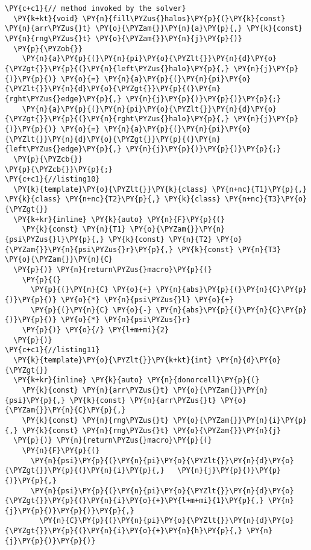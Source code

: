 \begin{Verbatim}[commandchars=\\\{\}]
  \PY{c+c1}{// method invoked by the solver}
  \PY{k+kt}{void} \PY{n}{fill\PYZus{}halos}\PY{p}{(}\PY{k}{const} \PY{n}{arr\PYZus{}t} \PY{o}{\PYZam{}}\PY{n}{a}\PY{p}{,} \PY{k}{const} \PY{n}{rng\PYZus{}t} \PY{o}{\PYZam{}}\PY{n}{j}\PY{p}{)}
  \PY{p}{\PYZob{}}
    \PY{n}{a}\PY{p}{(}\PY{n}{pi}\PY{o}{\PYZlt{}}\PY{n}{d}\PY{o}{\PYZgt{}}\PY{p}{(}\PY{n}{left\PYZus{}halo}\PY{p}{,} \PY{n}{j}\PY{p}{)}\PY{p}{)} \PY{o}{=} \PY{n}{a}\PY{p}{(}\PY{n}{pi}\PY{o}{\PYZlt{}}\PY{n}{d}\PY{o}{\PYZgt{}}\PY{p}{(}\PY{n}{rght\PYZus{}edge}\PY{p}{,} \PY{n}{j}\PY{p}{)}\PY{p}{)}\PY{p}{;}     
    \PY{n}{a}\PY{p}{(}\PY{n}{pi}\PY{o}{\PYZlt{}}\PY{n}{d}\PY{o}{\PYZgt{}}\PY{p}{(}\PY{n}{rght\PYZus{}halo}\PY{p}{,} \PY{n}{j}\PY{p}{)}\PY{p}{)} \PY{o}{=} \PY{n}{a}\PY{p}{(}\PY{n}{pi}\PY{o}{\PYZlt{}}\PY{n}{d}\PY{o}{\PYZgt{}}\PY{p}{(}\PY{n}{left\PYZus{}edge}\PY{p}{,} \PY{n}{j}\PY{p}{)}\PY{p}{)}\PY{p}{;}     
  \PY{p}{\PYZcb{}}
\PY{p}{\PYZcb{}}\PY{p}{;}
\PY{c+c1}{//listing10}
  \PY{k}{template}\PY{o}{\PYZlt{}}\PY{k}{class} \PY{n+nc}{T1}\PY{p}{,} \PY{k}{class} \PY{n+nc}{T2}\PY{p}{,} \PY{k}{class} \PY{n+nc}{T3}\PY{o}{\PYZgt{}} 
  \PY{k+kr}{inline} \PY{k}{auto} \PY{n}{F}\PY{p}{(}
    \PY{k}{const} \PY{n}{T1} \PY{o}{\PYZam{}}\PY{n}{psi\PYZus{}l}\PY{p}{,} \PY{k}{const} \PY{n}{T2} \PY{o}{\PYZam{}}\PY{n}{psi\PYZus{}r}\PY{p}{,} \PY{k}{const} \PY{n}{T3} \PY{o}{\PYZam{}}\PY{n}{C}
  \PY{p}{)} \PY{n}{return\PYZus{}macro}\PY{p}{(}
    \PY{p}{(}
      \PY{p}{(}\PY{n}{C} \PY{o}{+} \PY{n}{abs}\PY{p}{(}\PY{n}{C}\PY{p}{)}\PY{p}{)} \PY{o}{*} \PY{n}{psi\PYZus{}l} \PY{o}{+} 
      \PY{p}{(}\PY{n}{C} \PY{o}{-} \PY{n}{abs}\PY{p}{(}\PY{n}{C}\PY{p}{)}\PY{p}{)} \PY{o}{*} \PY{n}{psi\PYZus{}r}
    \PY{p}{)} \PY{o}{/} \PY{l+m+mi}{2}
  \PY{p}{)}
\PY{c+c1}{//listing11}
  \PY{k}{template}\PY{o}{\PYZlt{}}\PY{k+kt}{int} \PY{n}{d}\PY{o}{\PYZgt{}}  
  \PY{k+kr}{inline} \PY{k}{auto} \PY{n}{donorcell}\PY{p}{(} 
    \PY{k}{const} \PY{n}{arr\PYZus{}t} \PY{o}{\PYZam{}}\PY{n}{psi}\PY{p}{,} \PY{k}{const} \PY{n}{arr\PYZus{}t} \PY{o}{\PYZam{}}\PY{n}{C}\PY{p}{,} 
    \PY{k}{const} \PY{n}{rng\PYZus{}t} \PY{o}{\PYZam{}}\PY{n}{i}\PY{p}{,} \PY{k}{const} \PY{n}{rng\PYZus{}t} \PY{o}{\PYZam{}}\PY{n}{j}
  \PY{p}{)} \PY{n}{return\PYZus{}macro}\PY{p}{(}
    \PY{n}{F}\PY{p}{(}
      \PY{n}{psi}\PY{p}{(}\PY{n}{pi}\PY{o}{\PYZlt{}}\PY{n}{d}\PY{o}{\PYZgt{}}\PY{p}{(}\PY{n}{i}\PY{p}{,}   \PY{n}{j}\PY{p}{)}\PY{p}{)}\PY{p}{,} 
      \PY{n}{psi}\PY{p}{(}\PY{n}{pi}\PY{o}{\PYZlt{}}\PY{n}{d}\PY{o}{\PYZgt{}}\PY{p}{(}\PY{n}{i}\PY{o}{+}\PY{l+m+mi}{1}\PY{p}{,} \PY{n}{j}\PY{p}{)}\PY{p}{)}\PY{p}{,} 
        \PY{n}{C}\PY{p}{(}\PY{n}{pi}\PY{o}{\PYZlt{}}\PY{n}{d}\PY{o}{\PYZgt{}}\PY{p}{(}\PY{n}{i}\PY{o}{+}\PY{n}{h}\PY{p}{,} \PY{n}{j}\PY{p}{)}\PY{p}{)}

\end{Verbatim}
